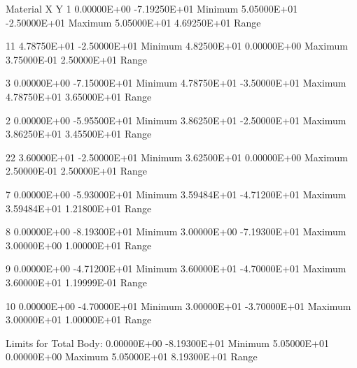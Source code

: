      Material        X             Y
         1      0.00000E+00  -7.19250E+01  Minimum
                5.05000E+01  -2.50000E+01  Maximum
                5.05000E+01   4.69250E+01  Range

        11      4.78750E+01  -2.50000E+01  Minimum
                4.82500E+01   0.00000E+00  Maximum
                3.75000E-01   2.50000E+01  Range

         3      0.00000E+00  -7.15000E+01  Minimum
                4.78750E+01  -3.50000E+01  Maximum
                4.78750E+01   3.65000E+01  Range

         2      0.00000E+00  -5.95500E+01  Minimum
                3.86250E+01  -2.50000E+01  Maximum
                3.86250E+01   3.45500E+01  Range

        22      3.60000E+01  -2.50000E+01  Minimum
                3.62500E+01   0.00000E+00  Maximum
                2.50000E-01   2.50000E+01  Range

         7      0.00000E+00  -5.93000E+01  Minimum
                3.59484E+01  -4.71200E+01  Maximum
                3.59484E+01   1.21800E+01  Range

         8      0.00000E+00  -8.19300E+01  Minimum
                3.00000E+00  -7.19300E+01  Maximum
                3.00000E+00   1.00000E+01  Range

         9      0.00000E+00  -4.71200E+01  Minimum
                3.60000E+01  -4.70000E+01  Maximum
                3.60000E+01   1.19999E-01  Range

        10      0.00000E+00  -4.70000E+01  Minimum
                3.00000E+01  -3.70000E+01  Maximum
                3.00000E+01   1.00000E+01  Range

     Limits for Total Body:
                0.00000E+00  -8.19300E+01  Minimum
                5.05000E+01   0.00000E+00  Maximum
                5.05000E+01   8.19300E+01  Range
